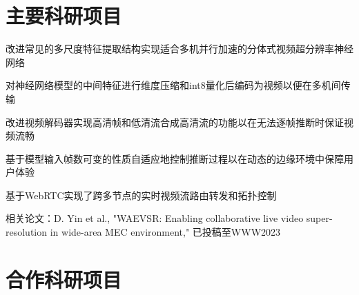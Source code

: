 \documentclass[]{deedy-resume-openfont}
\begin{document}
\begin{minipage}[t]{0.77\textwidth}


	\section{主要科研项目}
	\vspace{\topsep}
	\begin{tightemize}
		\item 改进常见的多尺度特征提取结构实现适合多机并行加速的分体式视频超分辨率神经网络
		\item 对神经网络模型的中间特征进行维度压缩和int8量化后编码为视频以便在多机间传输
		\item 改进视频解码器实现高清帧和低清流合成高清流的功能以在无法逐帧推断时保证视频流畅
		\item 基于模型输入帧数可变的性质自适应地控制推断过程以在动态的边缘环境中保障用户体验
		\item 基于WebRTC实现了跨多节点的实时视频流路由转发和拓扑控制
		\item 相关论文：D. Yin et al., "WAEVSR: Enabling collaborative live video super-resolution in wide-area MEC environment," 已投稿至WWW2023
	\end{tightemize}
    \sectionsep

	\section{合作科研项目}
	

\end{minipage}
\end{document}
